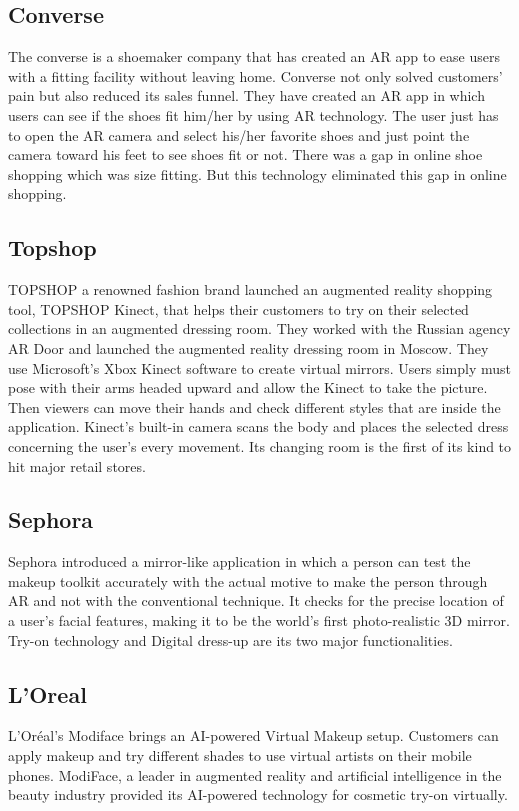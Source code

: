 \subsection{Converse}
 The converse is a shoemaker company that has created an AR app to ease users with a fitting facility without leaving home.
Converse not only solved customers’ pain but also reduced its sales funnel. They have created an AR app in which users can see if the shoes fit him/her by using AR technology. The user just has to open the AR camera and select his/her favorite shoes and just point the camera toward his feet to see shoes fit or not.
There was a gap in online shoe shopping which was size fitting. But this technology eliminated this gap in online shopping.
 \cite{Converse}
 
\subsection{Topshop}
TOPSHOP a renowned fashion brand launched an augmented reality shopping tool, TOPSHOP Kinect, that helps their customers to try on their selected collections in an augmented dressing room. They worked with the Russian agency AR Door and launched the augmented reality dressing room in Moscow. They use Microsoft's Xbox Kinect software to create virtual mirrors.
Users simply must pose with their arms headed upward and allow the Kinect to take the picture. Then viewers can move their hands and check different styles that are inside the application. Kinect’s built-in camera scans the body and places the selected dress concerning the user's every movement. Its changing room is the first of its kind to hit major retail stores.\cite{Topshop}
\subsection{Sephora}
\justifying
Sephora introduced a mirror-like application in which a person can test the makeup toolkit accurately with the actual motive to make the person through AR and not with the conventional technique. It checks for the precise location of a user’s facial features, making it to be the world’s first photo-realistic 3D mirror. Try-on technology and Digital dress-up are its two major functionalities. \cite{Sephora}
\subsection{L'Oreal}L'Oréal's Modiface brings an AI-powered Virtual Makeup setup. Customers can apply makeup and try different shades to use virtual artists on their mobile phones. ModiFace, a leader in augmented reality and artificial intelligence in the beauty industry provided its AI-powered technology for cosmetic try-on virtually.
\cite{Sephora}
